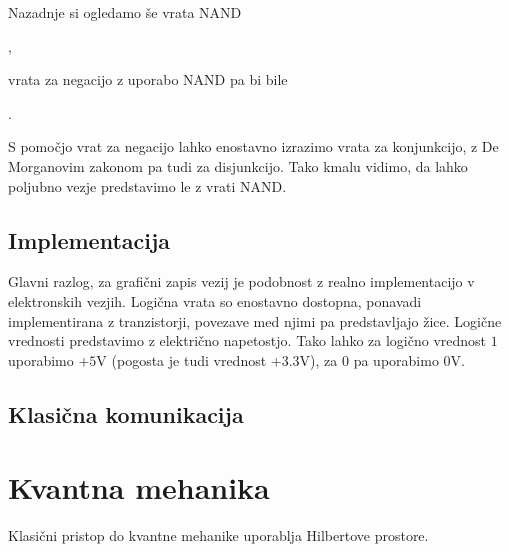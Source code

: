 \documentclass[mat1]{fmfdelo}
\begin{document}
Nazadnje si ogledamo še vrata NAND
\begin{center}
    ,
\end{center}
vrata za negacijo z uporabo NAND pa bi bile
\begin{center}
    .
\end{center}
S pomočjo vrat za negacijo lahko enostavno izrazimo vrata za konjunkcijo, z De Morganovim zakonom pa tudi za disjunkcijo. Tako kmalu vidimo, da lahko poljubno vezje predstavimo le z vrati NAND.

\subsection{Implementacija}
Glavni razlog, za grafični zapis vezij je podobnost z realno implementacijo v elektronskih vezjih. Logična vrata so enostavno dostopna, ponavadi implementirana z tranzistorji, povezave med njimi pa predstavljajo žice. Logične vrednosti predstavimo z električno napetostjo. Tako lahko za logično vrednost \(1\) uporabimo \(+5\)V (pogosta je tudi vrednost \(+3.3\)V), za \(0\) pa uporabimo \(0\)V.
\subsection{Klasična komunikacija}


\section{Kvantna mehanika}
Klasični pristop do kvantne mehanike uporablja Hilbertove prostore\cite[stran 12]{mathforqm}.
\end{document}
